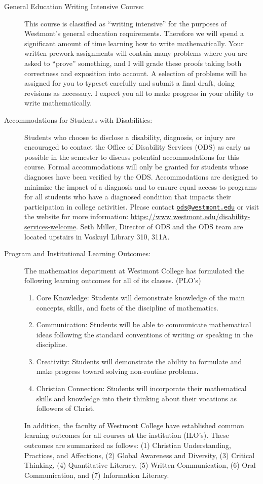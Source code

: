 \documentclass[
  twoside]{article}
\begin{document}
\begin{description}
\clearpage

\item[General Education Writing Intensive Course:] This course is
  classified as ``writing intensive'' for the purposes of Westmont's general
  education requirements.  Therefore we will spend a significant amount of time
  learning how to write mathematically.  Your written prework assignments will contain many
  problems where you are asked to ``prove'' something, and I will grade these
  proofs taking both correctness and exposition into account.  A selection of problems will be assigned for you to typeset carefully and submit a final draft, doing revisions as necessary. I expect you all to make progress in
  your ability to write mathematically.

\item[Accommodations for Students with Disabilities:] Students who choose to disclose a disability, diagnosis, or injury are encouraged to contact the Office of Disability Services (ODS) as early as possible in the semester to discuss potential accommodations for this course. Formal accommodations will only be granted for students whose diagnoses have been verified by the ODS. Accommodations are designed to minimize the impact of a diagnosis and to ensure equal access to programs for all students who have a diagnosed condition that impacts their participation in college activities. Please contact \href{mailto:ods@westmont.edu}{\tt ods@westmont.edu} or visit the website for more information: \url{https://www.westmont.edu/disability-services-welcome}. Seth Miller, Director of ODS and the ODS team are located upstairs in Voskuyl Library 310, 311A. 

\item[Program and Institutional Learning Outcomes:] The
         mathematics department at Westmont College has formulated the
         following learning outcomes for all of its classes. (PLO's)
\begin{enumerate}[noitemsep]
\item Core Knowledge: Students will demonstrate knowledge of the
                  main concepts, skills, and facts of the discipline of
                  mathematics.
\item Communication: Students will be able to communicate mathematical ideas
     following the standard conventions of writing or speaking in the
     discipline.
\item Creativity: Students will demonstrate the ability to formulate and make
     progress toward solving non-routine problems.
\item Christian Connection: Students will incorporate their mathematical skills
     and knowledge into their thinking about their vocations as followers of
     Christ.
         \end{enumerate}
         In addition, the faculty of Westmont College have established common
         learning outcomes for all courses at the institution
         (ILO's). These outcomes are summarized as follows:
(1) Christian Understanding, Practices, and Affections,
(2) Global Awareness and Diversity,
(3) Critical Thinking,
(4) Quantitative Literacy,
(5) Written Communication,
(6) Oral Communication, and
(7) Information Literacy.


\end{description}
\end{document}
